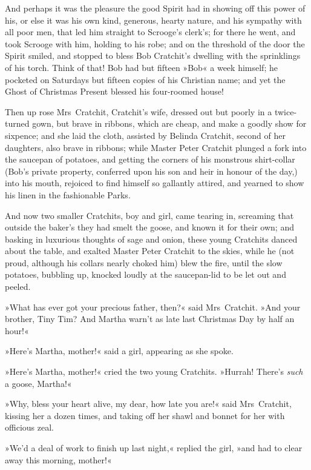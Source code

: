 And perhaps it was the pleasure the good Spirit had in showing off this power of his, or else it was his own kind, generous, hearty nature, and his sympathy with all poor men, that led him straight to Scrooge's clerk's; for there he went, and took Scrooge with him, holding to his robe; and on the threshold of the door the Spirit smiled, and stopped to bless Bob Cratchit's dwelling with the sprinklings of his torch. Think of that! Bob had but fifteen »Bob« a week himself; he pocketed on Saturdays but fifteen copies of his Christian name; and yet the Ghost of Christmas Present blessed his four-roomed house!



Then up rose Mrs~Cratchit, Cratchit's wife, dressed out but poorly in a twice-turned gown, but brave in ribbons, which are cheap, and make a goodly show for sixpence; and she laid the cloth, assisted by Belinda Cratchit, second of her daughters, also brave in ribbons; while Master Peter Cratchit plunged a fork into the saucepan of potatoes, and getting the corners of his monstrous shirt-collar (Bob's private property, conferred upon his son and heir in honour of the day,) into his mouth, rejoiced to find himself so gallantly attired, and yearned to show his linen in the fashionable Parks. 

And now two smaller Cratchits, boy and girl, came tearing in, screaming that outside the baker's they had smelt the goose, and known it for their own; and basking in luxurious thoughts of sage and onion, these young Cratchits danced about the table, and exalted Master Peter Cratchit to the skies, while he (not proud, although his collars nearly choked him) blew the fire, until the slow potatoes, bubbling up, knocked loudly at the saucepan-lid to be let out and peeled.

»What has ever got your precious father, then?« said Mrs~Cratchit. »And your brother, Tiny Tim? And Martha warn't as late last Christmas Day by half an hour!«

»Here's Martha, mother!« said a girl, appearing as she spoke.

»Here's Martha, mother!« cried the two young Cratchits. »Hurrah! There's \textit{such} a goose, Martha!«

»Why, bless your heart alive, my dear, how late you are!« said Mrs~Cratchit, kissing her a dozen times, and taking off her shawl and bonnet for her with officious zeal.

»We'd a deal of work to finish up last night,« replied the girl, »and had to clear away this morning, mother!«


